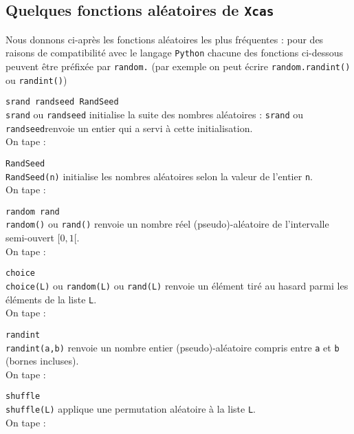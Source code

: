 \documentclass[12pt,a4paper]{book}
\begin{document}
\begin{giacjshere}
\subsection{Quelques fonctions al\'eatoires de {\tt Xcas}}

Nous donnons ci-apr\`es les fonctions al\'eatoires les plus fr\'equentes : pour 
des raisons de compatibilité avec le langage {\tt Python} chacune des fonctions 
ci-dessous peuvent \^etre pr\'efix\'ee par {\tt random.} (par exemple on peut 
\'ecrire {\tt random.randint()} ou {\tt randint()})

{\tt srand randseed RandSeed}\\
{\tt srand} ou {\tt  randseed} initialise la suite des nombres al\'eatoires : 
{\tt srand}  ou {\tt  randseed}renvoie un entier qui a servi \`a cette 
initialisation.\\
On tape :\\

{\tt RandSeed}\\
{\tt RandSeed(n)} initialise les nombres al\'eatoires selon la valeur de 
l'entier {\tt n}.\\
On tape :\\

{\tt random rand}\\
{\tt random()} ou {\tt rand()} renvoie un nombre r\'eel 
(pseudo)-al\'eatoire de l’intervalle semi-ouvert $[0,1[$.\\
On tape :\\

{\tt choice}\\
{\tt choice(L)} ou {\tt random(L)} ou {\tt rand(L)} renvoie un \'el\'ement
 tir\'e au hasard parmi les \'el\'ements de la liste {\tt L}.\\
On tape :\\

{\tt randint}\\
{\tt randint(a,b)} renvoie un nombre entier (pseudo)-al\'eatoire 
compris entre {\tt a} et {\tt b} (bornes incluses).\\
On tape :\\

{\tt shuffle}\\
{\tt shuffle(L)} applique une permutation al\'eatoire \`a la liste {\tt L}.\\
On tape :\\


\end{giacjshere}
\end{document}
